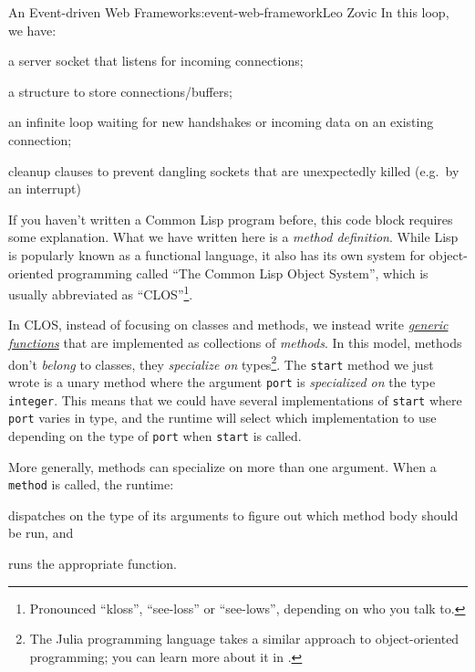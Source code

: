 \begin{aosachapter}{An Event-driven Web Framework}{s:event-web-framework}{Leo Zovic}
In this loop, we have:

\begin{aosaitemize}

\item
  a server socket that listens for incoming connections;
\item
  a structure to store connections/buffers;
\item
  an infinite loop waiting for new handshakes or incoming data on an
  existing connection;
\item
  cleanup clauses to prevent dangling sockets that are unexpectedly
  killed (e.g.~by an interrupt)
\end{aosaitemize}

If you haven't written a Common Lisp program before, this code block
requires some explanation. What we have written here is a \emph{method
definition}. While Lisp is popularly known as a functional language, it
also has its own system for object-oriented programming called ``The
Common Lisp Object System'', which is usually abbreviated as
``CLOS''\footnote{Pronounced ``kloss'', ``see-loss'' or ``see-lows'',
  depending on who you talk to.}.

\label{clos-and-generic-functions}

In CLOS, instead of focusing on classes and methods, we instead write
\href{http://www.gigamonkeys.com/book/object-reorientation-generic-functions.html}{\emph{generic
functions}} that are implemented as collections of \emph{methods}. In
this model, methods don't \emph{belong} to classes, they
\emph{specialize on} types\footnote{The Julia programming language takes
  a similar approach to object-oriented programming; you can learn more
  about it in .}. The \texttt{start}
method we just wrote is a unary method where the argument \texttt{port}
is \emph{specialized on} the type \texttt{integer}. This means that we
could have several implementations of \texttt{start} where \texttt{port}
varies in type, and the runtime will select which implementation to use
depending on the type of \texttt{port} when \texttt{start} is called.

More generally, methods can specialize on more than one argument. When a
\texttt{method} is called, the runtime:

\begin{aosaitemize}

\item
  dispatches on the type of its arguments to figure out which method
  body should be run, and
\item
  runs the appropriate function.
\end{aosaitemize}


\end{aosachapter}
